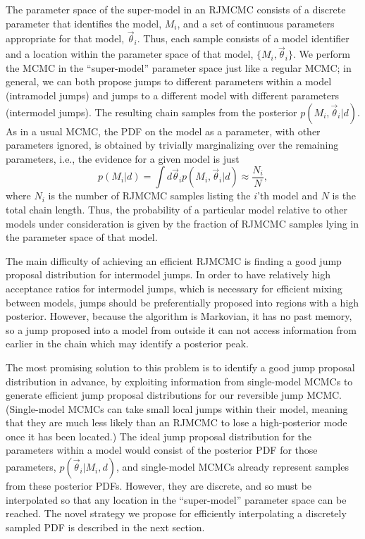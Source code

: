 \documentclass[prd,preprint]{revtex4}
\newcommand{\vtheta}{\vec{\theta}}
\newcommand{\be}{\begin{equation}}
\newcommand{\ee}{\end{equation}}
\begin{document}
The parameter space of the super-model in an RJMCMC consists of a discrete parameter that identifies the model, $M_i$, and a set of continuous parameters appropriate for that model, $\vtheta_i$.  Thus, each sample consists of a model identifier and a location within the parameter space of that model, $\{M_i, \vtheta_i\}$.  We perform the MCMC in the ``super-model'' parameter space just like a regular MCMC; in general, we can both propose jumps to different parameters within a model (intramodel jumps) and jumps to a different model with different parameters (intermodel jumps).  The resulting chain samples from the posterior $p(M_i,\vtheta_i|d)$.  As in a usual MCMC, the PDF on the model as a parameter, with other parameters ignored, is obtained by trivially marginalizing over the remaining parameters, i.e., the evidence for a given model is just
\be
    p(M_i|d) = \int d\vtheta_i p(M_i, \vtheta_i|d) \approx \frac{N_i}{N},
 \ee
 where $N_i$ is the number of RJMCMC samples listing the $i$'th model and $N$ is the total chain length.  Thus, the probability of a particular model relative to other models under consideration is given by the fraction of RJMCMC samples lying in the parameter space of that model.
 
The main difficulty of achieving an efficient RJMCMC is finding a good jump proposal distribution for intermodel jumps.  In order to have relatively high acceptance ratios for intermodel jumps, which is necessary for efficient mixing between models, jumps should be preferentially proposed into regions with a high posterior.  However, because the algorithm is Markovian, it has no past memory, so a jump proposed into a model from outside it can not access information from earlier in the chain which may identify a posterior peak.  

The most promising solution to this problem is to identify a good jump proposal distribution in advance, by exploiting information from single-model MCMCs to generate efficient jump proposal distributions for our reversible jump MCMC.  (Single-model MCMCs can take small local jumps within their model, meaning that they are much less likely than an RJMCMC to lose a high-posterior mode once it has been located.)  The ideal jump proposal distribution for the parameters within a model would consist of the posterior PDF for those parameters, $p(\vtheta_i|M_i,d)$, and single-model MCMCs already represent samples from these posterior PDFs.  However, they are discrete, and so must be interpolated so that any location in the ``super-model'' parameter space can be reached.  The novel strategy we propose for efficiently interpolating a discretely sampled PDF is described in the next section.
\end{document}
